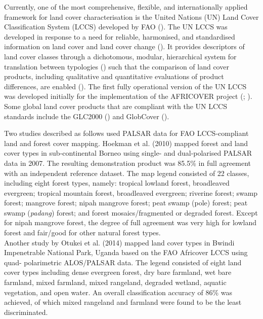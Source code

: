 Currently, one of the most comprehensive, flexible, and internationally applied framework for land cover characterisation is the United Nations (UN) Land Cover Classification System (LCCS) developed by FAO (\cite{giri_brief_2012}). The UN LCCS was developed in response to a need for reliable, harmonised, and standardised information on land cover and land cover change (\cite{di_gregorio_land_2005}). It provides descriptors of land cover classes through a dichotomous, modular, hierarchical system for translation between typologies (\cite{defourny_revisiting_2012}) such that the comparison of land cover products, including qualitative and quantitative evaluations of product differences, are enabled (\cite{kuenzer_comparing_2014}). The first fully operational version of the UN LCCS was developed initially for the implementation of the AFRICOVER project (\cite{kalensky_africover_1998}; \cite{herold_evaluating_2012}). Some global land cover products that are compliant with the UN LCCS standards include the GLC2000 (\cite{bartholome_glc2000:_2005}) and GlobCover (\cite{arino_globcover:_2007}).

Two studies described as follows used PALSAR data for FAO LCCS-compliant land and forest cover mapping. Hoekman et al. (2010) mapped forest and land cover types in sub-continental Borneo using single- and dual-polarised PALSAR data in 2007. The resulting demonstration product was 85.5\% in full agreement with an independent reference dataset. The map legend consisted of 22 classes, including eight forest types, namely: tropical lowland forest, broadleaved evergreen; tropical mountain forest, broadleaved evergreen; riverine forest; swamp forest; mangrove forest; nipah mangrove forest; peat swamp (pole) forest; peat swamp (\textit{padang}) forest; and forest mosaics/fragmented or degraded forest. Except for nipah mangrove forest, the degree of full agreement was very high for lowland forest and fair/good for other natural forest types.\\

Another study by Otukei et al. (2014) mapped land cover types in Bwindi Impenetrable National Park, Uganda based on the FAO Africover LCCS using quad- polarimetric ALOS/PALSAR data. The legend consisted of eight land cover types including dense evergreen forest, dry bare farmland, wet bare farmland, mixed farmland, mixed rangeland, degraded wetland, aquatic vegetation, and open water. An overall classification accuracy of 86\% was achieved, of which mixed rangeland and farmland were found to be the least discriminated.

